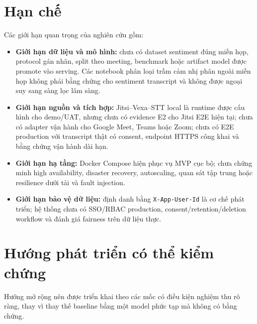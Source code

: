 \section{Hạn chế}
Các giới hạn quan trọng của nghiên cứu gồm:

\begin{itemize}
  \item \textbf{Giới hạn dữ liệu và mô hình:} chưa có dataset sentiment đúng miền họp, protocol gán nhãn, split theo meeting, benchmark hoặc artifact model được promote vào serving. Các notebook phân loại trầm cảm nhị phân ngoài miền họp không phải bằng chứng cho sentiment transcript và không được ngoại suy sang sàng lọc lâm sàng.
  \item \textbf{Giới hạn nguồn và tích hợp:} Jitsi--Vexa--STT local là runtime được cấu hình cho demo/UAT, nhưng chưa có evidence E2 cho Jitsi E2E hiện tại; chưa có adapter vận hành cho Google Meet, Teams hoặc Zoom; chưa có E2E production với transcript thật có consent, endpoint HTTPS công khai và bằng chứng vận hành dài hạn.
  \item \textbf{Giới hạn hạ tầng:} Docker Compose hiện phục vụ MVP cục bộ; chưa chứng minh high availability, disaster recovery, autoscaling, quan sát tập trung hoặc resilience dưới tải và fault injection.
  \item \textbf{Giới hạn bảo vệ dữ liệu:} định danh bằng \texttt{X-App-User-Id} là cơ chế phát triển; hệ thống chưa có SSO/RBAC production, consent/retention/deletion workflow và đánh giá fairness trên dữ liệu thực.
\end{itemize}

\section{Hướng phát triển có thể kiểm chứng}
Hướng mở rộng nên được triển khai theo các mốc có điều kiện nghiệm thu rõ ràng, thay vì thay thế baseline bằng một model phức tạp mà không có bằng chứng.

